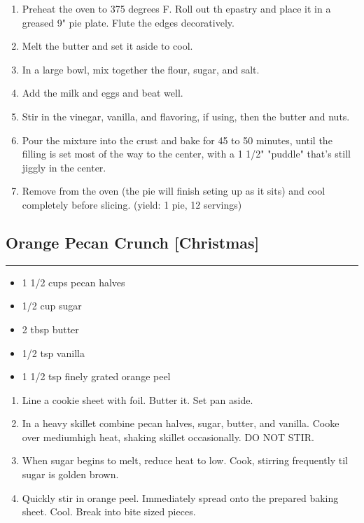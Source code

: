 \documentclass{article}
\begin{document}
\begin{enumerate}
    \item 
        Preheat the oven to 375 degrees F. Roll out th epastry and place it in a greased 9" pie plate. Flute the edges decoratively.
    \item 
        Melt the butter and set it aside to cool.
    \item 
        In a large bowl, mix together the flour, sugar, and salt.
    \item 
        Add the milk and eggs and beat well.
    \item 
        Stir in the vinegar, vanilla, and flavoring, if using, then the butter and nuts.
    \item 
        Pour the mixture into the crust and bake for 45 to 50 minutes, until the filling is set most of the way to the center, with a 1 1/2" "puddle" that's still jiggly in the center.
    \item 
        Remove from the oven (the pie will finish seting up as it sits) and cool completely before slicing. (yield: 1 pie, 12 servings)
\end{enumerate}
\newpage 

\subsection{Orange Pecan Crunch [Christmas]} 
\noindent\rule[0.5ex]{\linewidth}{1pt}

\begin{framed}
\begin{itemize}
    \item 1 1/2 cups pecan halves
    \item 1/2 cup sugar
    \item 2 tbsp butter
    \item 1/2 tsp vanilla
    \item 1 1/2 tsp finely grated orange peel
\end{itemize}
\end{framed}

\begin{enumerate}
    \item 
        Line a cookie sheet with foil. Butter it. Set pan aside.
    \item  
        In a heavy skillet combine pecan halves, sugar, butter, and vanilla. Cooke over mediumhigh heat, shaking skillet occasionally. DO NOT STIR.
    \item 
        When sugar begins to melt, reduce heat to low. Cook, stirring frequently til sugar is golden brown. 
    \item 
        Quickly stir in orange peel. Immediately spread onto the prepared baking sheet. Cool. Break into bite sized pieces.
\end{enumerate}
\newpage
\end{document}
